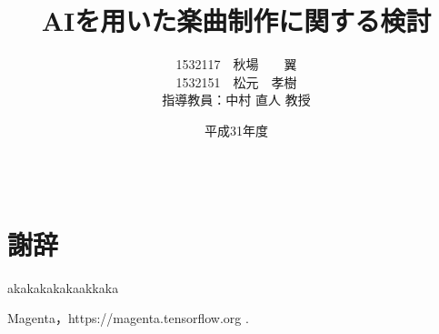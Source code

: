 \documentclass[12pt]{jreport}
\title{AIを用いた楽曲制作に関する検討}					%
\author{1532117　秋場　　翼\\1532151　松元　孝樹\\\normalsize 指導教員：中村 直人 教授}	%
\date{平成31年度}                   %
\begin{document}
\maketitle                        	%
\tableofcontents               	%
\listoffigures				%
\listoftables				%

\baselineskip 20pt              	%

\clearpage
{}



%






\newpage




\chapter*{　\\謝辞}

akakakakakaakkaka


\begin{thebibliography}{99}%






Magenta，https://magenta.tensorflow.org .

\end{thebibliography}

\end{document}
